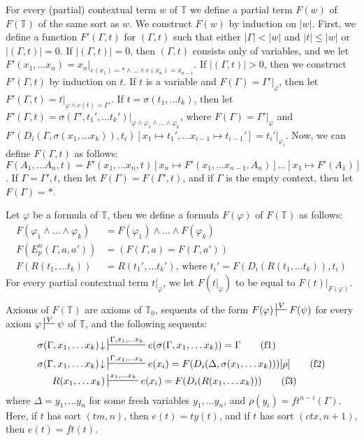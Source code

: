 \documentclass[reqno]{amsart}
\newcommand{\axtag}[1]{\label{ax:#1} \tag{#1}}
\theoremstyle{definition}
\theoremstyle{remark}
\numberwithin{figure}{section}
\begin{document}
For every (partial) contextual term $w$ of $\mathbb{T}$ we define a partial term $F(w)$ of $F(\mathbb{T})$ of the same sort as $w$.
We construct $F(w)$ by induction on $|w|$.
First, we define a function $F'(\Gamma,t)$ for $(\Gamma,t)$ such that either $|\Gamma| < |w|$ and $|t| \leq |w|$ or $|(\Gamma,t)| = 0$.
If $|(\Gamma,t)| = 0$, then $(\Gamma,t)$ consists only of variables, and we let $F'(x_1, \ldots x_n) = x_n|_{e(x_1) = * \land \ldots \land e(x_n) = x_{n-1}}$.
If $|(\Gamma,t)| > 0$, then we construct $F'(\Gamma,t)$ by induction on $t$.
If $t$ is a variable and $F(\Gamma) = \Gamma'|_\varphi$, then let $F'(\Gamma,t) = t|_{\varphi \land e(t) = \Gamma'}$.
If $t = \sigma(t_1, \ldots t_k)$, then let $F'(\Gamma,t) = \sigma(\Gamma', t_1', \ldots t_k')|_{\varphi \land \varphi_1 \land \ldots \land \varphi_k}$,
    where $F(\Gamma) = \Gamma'|_\varphi$ and $F'(D_i(\Gamma,\sigma(x_1, \ldots x_k)), t_i)[x_1 \mapsto t_1', \ldots x_{i-1} \mapsto t_{i-1}'] = t_i'|_{\varphi_i}$.
Now, we can define $F(\Gamma,t)$ as follows: $F(A_1, \ldots A_n, t) = F'(x_1, \ldots x_n, t)[x_n \mapsto F'(x_1, \ldots x_{n-1}, A_n)] \ldots \allowbreak [x_1 \mapsto F'(A_1)]$.
If $\Gamma = \Gamma',t$, then let $F(\Gamma) = F(\Gamma',t)$, and if $\Gamma$ is the empty context, then let $F(\Gamma) = *$.

Let $\varphi$ be a formula of $\mathbb{T}$, then we define a formula $F(\varphi)$ of $F(\mathbb{T})$ as follows:
\begin{align*}
F(\varphi_1 \land \ldots \land \varphi_k) & = F(\varphi_1) \land \ldots \land F(\varphi_k) \\
F(E^n_p(\Gamma, a, a')) & = (F(\Gamma, a) = F(\Gamma, a')) \\
F(R(t_1, \ldots t_k)) & = R(t_1', \ldots t_k') \text{, where $t_i' = F(D_i(R(t_1, \ldots t_k)), t_i)$}
\end{align*}
For every partial contextual term $t|_\varphi$, we let $F(t|_\varphi)$ to be equal to $F(t)|_{F(\varphi)}$.

Axioms of $F(\mathbb{T})$ are axioms of $\mathbb{T}_0$, sequents of the form $F(\varphi) \sststile{}{V} F(\psi)$
    for every axiom $\varphi \sststile{}{V} \psi$ of $\mathbb{T}$, and the following sequents:
\begin{align*}
\sigma(\Gamma, x_1, \ldots x_k)\!\downarrow & \sststile{}{\Gamma, x_1, \ldots x_k} e(\sigma(\Gamma, x_1, \ldots x_k)) = \Gamma \axtag{f1} \\
\sigma(\Gamma, x_1, \ldots x_k)\!\downarrow & \sststile{}{\Gamma, x_1, \ldots x_k} e(x_i) = F(D_i(\Delta, \sigma(x_1, \ldots x_k)))[\rho] \axtag{f2} \\
R(x_1, \ldots x_k) & \sststile{}{x_1, \ldots x_k} e(x_i) = F(D_i(R(x_1, \ldots x_k))) \axtag{f3}
\end{align*}
where $\Delta = y_1, \ldots y_n$ for some fresh variables $y_1, \ldots y_n$, and $\rho(y_i) = ft^{n-i}(\Gamma)$.
Here, if $t$ has sort $(tm,n)$, then $e(t) = ty(t)$, and if $t$ has sort $(ctx,n+1)$, then $e(t) = ft(t)$.
\end{document}
